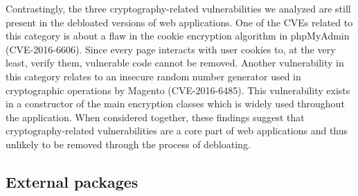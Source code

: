 Contrastingly, the three cryptography-related vulnerabilities we analyzed are
still present in the debloated versions of web applications. One of the CVEs
related to this category is about a flaw in the cookie encryption algorithm in
phpMyAdmin (CVE-2016-6606). Since every page interacts with user
cookies to, at the very least, verify them, vulnerable code cannot be
removed. Another vulnerability in this category relates to an insecure random
number generator used in cryptographic operations by Magento (CVE-2016-6485).
This vulnerability exists in a constructor of the main encryption
classes which is widely used throughout the application. When considered
together, these findings suggest that cryptography-related vulnerabilities
are a core part of web applications and thus unlikely to be removed through
the process of debloating.


\subsection{External packages}
\label{subsec:external}


